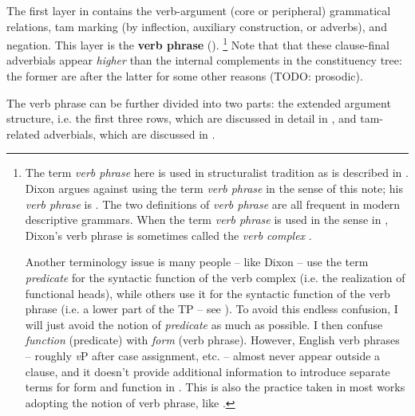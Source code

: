 \documentclass[UTF8, a4paper, oneside, scheme=plain, 12pt]{ctexbook}
\newcommand*{\concept}[1]{\textbf{#1}}
\newcommand*{\term}[1]{\emph{#1}}
\newcommand{\vP}{\textit{v}P}
\begin{document}
The first layer in  
contains the verb-argument (core or peripheral) grammatical relations,
\ac{tam} marking (by inflection, auxiliary construction, or adverbs), and negation.
This layer is the \concept{verb phrase} ().%
\footnote{
    The term \term{verb phrase} here 
    is used in structuralist tradition as is described in \citet{cgel}.
    Dixon argues against using the term \term{verb phrase} in the sense of this note;
    his \term{verb phrase} is .
    The two definitions of \term{verb phrase} are all frequent in modern descriptive grammars.
    When the term \term{verb phrase} is used in the sense in ,
    Dixon's verb phrase is sometimes called the \term{verb complex} \citep{Friesen2017}.

    Another terminology issue is many people -- like Dixon -- use the term \term{predicate}
    for the syntactic function of the verb complex
    (i.e. the realization of functional heads),
    while others use it for the syntactic function of the verb phrase 
    (i.e. a lower part of the TP -- see ).
    To avoid this endless confusion, 
    I will just avoid the notion of \term{predicate} as much as possible.
    I then confuse \emph{function} (predicate)
    with \emph{form} (verb phrase).
    However, English verb phrases -- roughly \vP{} after case assignment, etc. -- 
    almost never appear outside a clause,
    and it doesn't provide additional information 
    to introduce separate terms for form and function in .
    This is also the practice taken in most works adopting the notion of verb phrase,
    like \citet{Friesen2017}.
}
Note that that these clause-final adverbials 
appear \emph{higher} than the internal complements 
in the constituency tree:
the former are after the latter for some other reasons (TODO: prosodic).

The verb phrase can be further divided into two parts: 
the extended argument structure, 
i.e. the first three rows,
which are discussed in detail in ,
and \acs{tam}-related adverbials,
which are discussed in .
\end{document}
